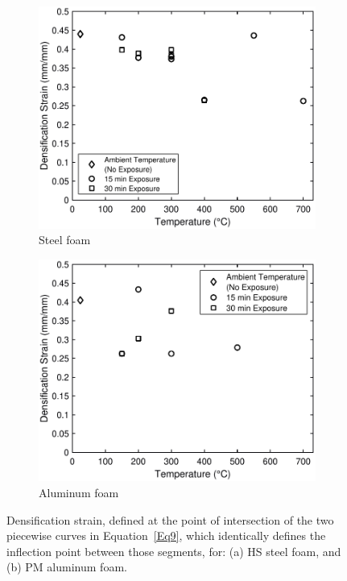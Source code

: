 \documentclass[review]{elsarticle}
\begin{document}
\begin{figure}
	\centering
	\begin{subfigure}{0.50\textwidth}
		\centering
		\includegraphics[width=0.90\linewidth]
		{Tex-Figures/Fig19a_Densification_Strain_Steel.pdf}
		\caption{Steel foam}
		\label{fig:densification_Steel}
	\end{subfigure}%
	\begin{subfigure}{0.50\textwidth}
		\centering
		\includegraphics[width=0.90\linewidth]
		{Tex-Figures/Fig19b_Densification_Strain_Aluminum.pdf}
		\caption{Aluminum foam}
		\label{fig:densifiation_Al}
	\end{subfigure}
	\caption{ Densification strain, defined at the point of intersection of the two piecewise curves in Equation~\ref{Eq9}, which identically defines the inflection point between those segments, for: (a) HS steel foam, and (b) PM aluminum foam.}
	\label{fig:densification-modulus}
\end{figure}
\end{document}

